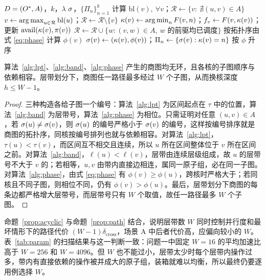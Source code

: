 \begin{algorithm}[H]
\caption{通信感知表调度与相位构造 $\mathrm{PHASE}(D,k,\lambda)$}\label{alg:phase}
\begin{algorithmic}[1]
\Require $D=(O^{\ast},A)$，$k$，$\lambda$
\Ensure $\sigma$，$\{\Pi_n\}_{n=1}^{k}$
\State 计算 $\mathrm{bl}(v),\ \forall v$；$\mathcal{R}\gets\{v:\ \nexists (u,v)\in A\}$
  \State $v\gets\operatorname*{arg\,max}_{u\in\mathcal{R}}\mathrm{bl}(u)$；$\mathcal{R}\gets\mathcal{R}\setminus\{v\}$
  \State $\kappa(v)\gets\operatorname*{arg\,min}_n F(v,n)$；$f_v\gets F(v,\kappa(v))$；更新 $\mathrm{avail}(\kappa(v),\pi(v))$
  \State $\mathcal{R}\gets\mathcal{R}\cup\{w:(v,w)\in A,\ w \text{ 的前驱均已调度}\}$
\EndWhile
\State 按拓扑序由式 \eqref{eq:phase} 计算 $\phi(v)$
\State $\sigma(v)\gets(\kappa(v),\phi(v))$；$\Pi_n\gets\{\sigma(v):\kappa(v)=n\}$ 按 $\phi$ 升序
\end{algorithmic}
\end{algorithm}


\begin{proposition}\label{prop:acyclic}
算法~\ref{alg:lpt}、\ref{alg:band}、\ref{alg:phase} 产生的商图均无环，且各核的子图顺序与依赖相容。层带划分下，商图任一路径最多经过 $W$ 个子图，从而换核深度 $h\le W-1$。
\end{proposition}
\begin{proof}
三种构造各给子图一个编号：算法~\ref{alg:lpt} 为区间起点在 $\tau$ 中的位置，算法~\ref{alg:band} 为层带号，算法~\ref{alg:phase} 为相位。只需证明对任意 $(u,v)\in A$，若 $\sigma(u)\ne\sigma(v)$，则 $\sigma(u)$ 的编号严格小于 $\sigma(v)$ 的编号，这样按编号排序就是商图的拓扑序，同核按编号排列也就与依赖相容。对算法~\ref{alg:lpt}，$\tau(u)<\tau(v)$，而区间互不相交且连续，所以 $u$ 所在区间整体位于 $v$ 所在区间之前。对算法~\ref{alg:band}，$\ell(u)<\ell(v)$，层带由连续层级组成，故 $u$ 的层带号不大于 $v$ 的；若相等，$u,v$ 由带内直接边相连，属同一原子组，必在同一子图。对算法~\ref{alg:phase}，由式 \eqref{eq:phase} 有 $\phi(v)\ge\phi(u)$，跨核时严格大于；若同核且不同子图，则相位不同，仍有 $\phi(v)>\phi(u)$。最后，层带划分下商图的每条边都严格增大层带号，而层带号只有 $W$ 个取值，故任一路径最多 $W$ 个子图。
\end{proof}

命题~\ref{prop:acyclic} 与命题~\ref{prop:path} 结合，说明层带数 $W$ 同时控制并行度和最坏情形下的路径代价 $(W-1)\delta_{\mathrm{cross}}$，场景 A 中后者代价高，应偏向较小的 $W$。表~\ref{tab:param} 的扫描结果与这一判断一致：问题一中固定 $W=16$ 的平均加速比高于 $W=256$ 和 $W=4096$。但 $W$ 也不能过小，层带太少时每个层带内操作过多，带内有直接依赖的操作被并成大的原子组，装箱就难以均衡，所以最终仍要逐用例选择 $W$。


